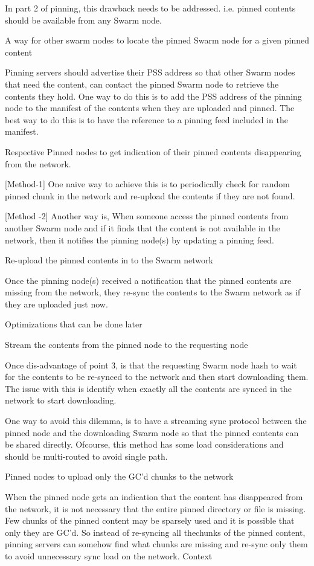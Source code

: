 In part 2 of pinning, this drawback needs to be addressed. i.e. pinned contents should be available from any Swarm node.


    A way for other swarm nodes to locate the pinned Swarm node for a given pinned content

    Pinning servers should advertise their PSS address so that other Swarm nodes that need the content, can contact the pinned Swarm node to retrieve the contents they hold. One way to do this is to add the PSS address of the pinning node to the manifest of the contents when they are uploaded and pinned. The best way to do this is to have the reference to a pinning feed included in the manifest.

    Respective Pinned nodes to get indication of their pinned contents disappearing from the network.

    [Method-1] One naive way to achieve this is to periodically check for random pinned chunk in the network and re-upload the contents if they are not found.

    [Method -2] Another way is, When someone access the pinned contents from another Swarm node and if it finds that the content is not available in the network, then it notifies the pinning node(s) by updating a pinning feed.

    Re-upload the pinned contents in to the Swarm network

    Once the pinning node(s) received a notification that the pinned contents are missing from the network, they re-sync the contents to the Swarm network as if they are uploaded just now.

Optimizations that can be done later

    Stream the contents from the pinned node to the requesting node

Once dis-advantage of point 3, is that the requesting Swarm node hash to wait for the contents to be re-synced to the network and then start downloading them. The issue with this is identify when exactly all the contents are synced in the network to start downloading.

One way to avoid this dilemma, is to have a streaming sync protocol between the pinned node and the downloading Swarm node so that the pinned contents can be shared directly. Ofcourse, this method has some load considerations and should be multi-routed to avoid single path.

    Pinned nodes to upload only the GC'd chunks to the network

When the pinned node gets an indication that the content has disappeared from the network, it is not necessary that the entire pinned directory or file is missing. Few chunks of the pinned content may be sparsely used and it is possible that only they are GC'd. So instead of re-syncing all thechunks of the pinned content, pinning servers can somehow find what chunks are missing and re-sync only them to avoid unnecessary sync load on the network.
Context

